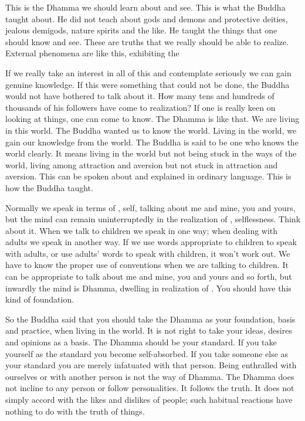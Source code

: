 This is the Dhamma we should learn about and see. This is what the Buddha taught about. He did not teach about gods and demons and  protective deities, jealous demigods, nature spirits and the like. He taught the things that one should know and see. These are truths that we really should be able to realize. External phenomena are like this, exhibiting the 

If we really take an interest in all of this and contemplate seriously we can gain genuine knowledge. If this were something that could not be done, the Buddha would not have bothered to talk about it. How many tens and hundreds of thousands of his followers have come to realization? If one is really keen on looking at things, one can come to know. The Dhamma is like that. We are living in this world. The Buddha wanted us to know the world. Living in the world, we gain our knowledge from the world. The Buddha is said to be  one who knows the world clearly. It means living in the world but not being stuck in the ways of the world, living among attraction and aversion but not stuck in attraction and aversion. This can be spoken about and explained in ordinary language. This is how the Buddha taught. 

Normally we speak in terms of , self, talking about me and mine, you and yours, but the mind can remain uninterruptedly in the realization of , selflessness. Think about it. When we talk to children we speak in one way; when dealing with adults we speak in another way. If we use words appropriate to children to speak with adults, or use adults' words to speak with children, it won't work out. We have to know the proper use of conventions when we are talking to children. It can be appropriate to talk about me and mine, you and yours and so forth, but inwardly the mind is Dhamma, dwelling in realization of . You should have this kind of foundation. 

So the Buddha said that you should take the Dhamma as your foundation, basis and practice, when living in the world. It is not right to take your ideas, desires and opinions as a basis. The Dhamma should be your standard. If you take yourself as the standard you become self-absorbed. If you take someone else as your standard you are merely infatuated with that person. Being enthralled with ourselves or with another person is not the way of Dhamma. The Dhamma does not incline to any person or follow personalities. It follows the truth. It does not simply accord with the likes and dislikes of people; such habitual reactions have nothing to do with the truth of things. 

